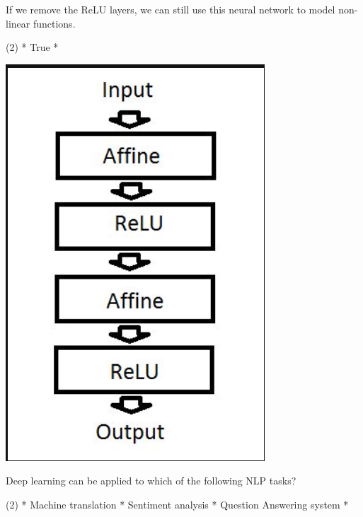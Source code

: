 \documentclass[10pt]{extarticle}
\begin{document}
\begin{exercise}
    \begin{minipage}[t]{.6\textwidth}
        If we remove the ReLU layers, we can still use this neural network to model non-linear functions.    
        \begin{choice} (2)
            * True
            *
        \end{choice}
    \end{minipage}
    \begin{minipage}[t]{.3\textwidth}
        \vspace*{0pt}
        \includegraphics[scale = .2]{nn_layer}    
    \end{minipage}
\end{exercise}
\begin{solution}
\end{solution}

\begin{exercise}
    Deep learning can be applied to which of the following NLP tasks?
    \begin{choice} (2)
        * Machine translation
        * Sentiment analysis
        * Question Answering system
        *
    \end{choice}
\end{exercise}
\begin{solution}
\end{solution}
\end{document}
